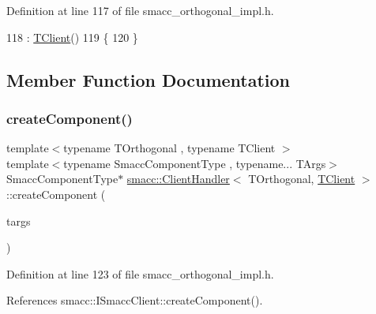 Definition at line 117 of file smacc\+\_\+orthogonal\+\_\+impl.\+h.


\begin{DoxyCode}
118         : \hyperlink{classTClient}{TClient}()
119     \{
120     \}
\end{DoxyCode}


\subsection{Member Function Documentation}
\mbox{\label{classsmacc_1_1ClientHandler_a4a9adad4c37104586c9b595d9030bb3c}} 
\subsubsection{\texorpdfstring{create\+Component()}{createComponent()}}
{\footnotesize\ttfamily template$<$typename T\+Orthogonal , typename T\+Client $>$ \\
template$<$typename Smacc\+Component\+Type , typename... T\+Args$>$ \\
Smacc\+Component\+Type$\ast$ \hyperlink{classsmacc_1_1ClientHandler}{smacc\+::\+Client\+Handler}$<$ T\+Orthogonal, \hyperlink{classTClient}{T\+Client} $>$\+::create\+Component (\begin{DoxyParamCaption}\item[{T\+Args...}]{targs }\end{DoxyParamCaption})\hspace{0.3cm}{\ttfamily [inline]}}



Definition at line 123 of file smacc\+\_\+orthogonal\+\_\+impl.\+h.



References smacc\+::\+I\+Smacc\+Client\+::create\+Component().


